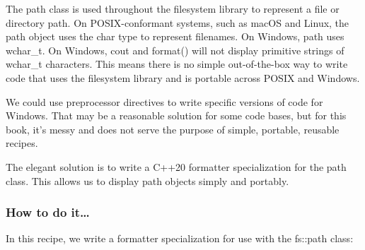 
The path class is used throughout the filesystem library to represent a file or directory path. On POSIX-conformant systems, such as macOS and Linux, the path object uses the char type to represent filenames. On Windows, path uses wchar\_t. On Windows, cout and format() will not display primitive strings of wchar\_t characters. This means there is no simple out-of-the-box way to write code that uses the filesystem library and is portable across POSIX and Windows.

We could use preprocessor directives to write specific versions of code for Windows. That may be a reasonable solution for some code bases, but for this book, it's messy and does not serve the purpose of simple, portable, reusable recipes.

The elegant solution is to write a C++20 formatter specialization for the path class. This allows us to display path objects simply and portably.


\subsubsection{How to do it…}

In this recipe, we write a formatter specialization for use with the fs::path class:

